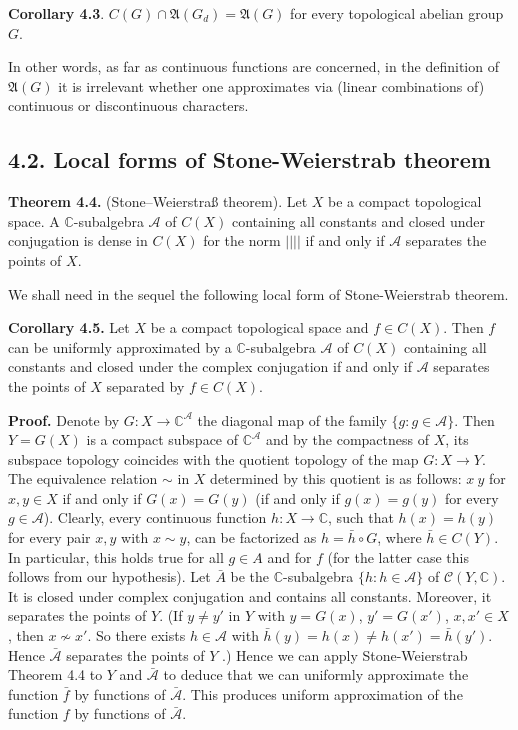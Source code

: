 \documentclass[12pt]{article}
\begin{document}
\textbf{Corollary 4.3}. $C(G) \cap \mathfrak{A}(G_d) = \mathfrak{A}(G)$ for every topological abelian group $G$.


In other words, as far as continuous functions are concerned, in the definition of $\mathfrak{A}(G)$ it is irrelevant whether one
approximates via (linear combinations of) continuous or discontinuous characters.


\subsection{4.2. Local forms of Stone-Weierstrab theorem}


\textbf{Theorem 4.4.} (Stone–Weierstraß theorem). Let $X$ be a compact topological space. A $\mathbb{C}$-subalgebra $\mathcal{A}$ of $C(X)$ containing all constants
and closed under conjugation is dense in $C(X)$ for the norm $|| ||$ if and only if $\mathcal{A}$ separates the points of $X$.


    We shall need in the sequel the following local form of Stone-Weierstrab theorem.


\textbf{Corollary 4.5.} Let $X$ be a compact topological space and $f \in C(X)$. Then $f$ can be uniformly approximated by a $\mathbb{C}$-subalgebra $\mathcal{A}$
of $C(X)$ containing all constants and closed under the complex conjugation if and only if $\mathcal{A}$ separates the points of $X$ separated by
$f \in C(X)$.


\textbf{Proof.} Denote by $G : X \to \mathbb{C}^{\mathcal{A}}$ the diagonal map of the family $\{g: g \in \mathcal{A}\}$. Then $Y = G(X)$ is a compact subspace of $\mathbb{C}^{\mathcal{A}}$ and
by the compactness of $X$, its subspace topology coincides with the quotient topology of the map $G : X \to Y$. The equivalence
relation $\sim$ in $X$ determined by this quotient is as follows: $x ~ y$ for $x, y \in X$ if and only if $G(x) = G(y)$ (if and only if
$g(x) = g(y)$ for every $g \in \mathcal{A}$). Clearly, every continuous function $h : X \to \mathbb{C}$, such that $h(x) = h(y)$ for every pair $x, y$ with
$x \sim y$, can be factorized as $h = \bar{h} \circ G$, where $\bar{h} \in C(Y)$. In particular, this holds true for all $g \in A$ and for $f$ (for the latter case
this follows from our hypothesis). Let $\bar{A}$ be the $\mathbb{C}$-subalgebra $\{h: h \in \mathcal{A}\}$ of $\mathcal{C}(Y, \mathbb{C})$. It is closed under complex conjugation
and contains all constants. Moreover, it separates the points of $Y$. (If $y \neq y'$ in $Y$ with $y = G(x)$, $y' = G(x')$, $x, x' \in X$, then
$x \nsim x'$. So there exists $h \in \mathcal{A}$ with $\bar{h}(y) = h(x) \neq h(x') = \bar{h}(y')$. Hence $\bar{\mathcal{A}}$ separates the points of $Y$ .) Hence we can apply
Stone-Weierstrab Theorem 4.4 to $Y$ and $\bar{\mathcal{A}}$ to deduce that we can uniformly approximate the function $\bar{f}$ by functions of $\bar{\mathcal{A}}$.
This produces uniform approximation of the function $f$ by functions of $\bar{\mathcal{A}}$. 
\end{document}
